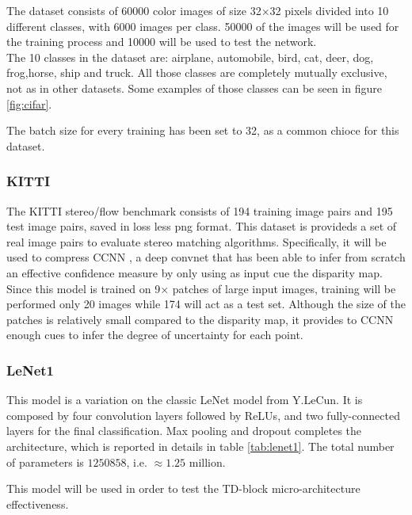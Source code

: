The dataset consists of 60000 color images of size 32×32 pixels divided into 10 different classes, with 6000 images per class. 50000 of the images will be used for the training process and 10000 will be used to test the network. \\
The 10 classes in the dataset are: airplane, automobile, bird, cat, deer, dog, frog,horse, ship and truck. All those classes are completely mutually exclusive, not as in other datasets. Some examples of those classes can be seen in figure \ref{fig:cifar}. 

The batch size for every training has been set to 32, as a common chioce for this dataset.

\subsubsection{KITTI}
The KITTI stereo/flow benchmark consists of 194 training image pairs and 195 test image pairs, saved in loss less png format. This dataset is provideds a set of real image pairs to evaluate stereo matching algorithms. Specifically, it will be used to compress CCNN \parencite{WCCNN}, a deep convnet that has been able to infer from scratch an effective confidence measure by only using as input cue the disparity map. 
\\

Since this model is trained on 9$\times $ patches of large input images, training will be performed only 20 images while 174 will act as a test set. Although the size of the patches is relatively small compared to the disparity map, it provides to CCNN enough cues to infer the degree of uncertainty for each point.

\subsubsection{LeNet1}
This model is a variation on the classic LeNet\parencite{lenet} model from Y.LeCun. It is composed by four convolution layers followed by ReLUs, and two fully-connected layers for the final classification. Max pooling and dropout completes the architecture, which is reported in details in table  \ref{tab:lenet1}. The total number of parameters is $1250858$, i.e. $\approx 1.25$ million. 
\newline 

This model will be used in order to test the TD-block micro-architecture effectiveness. 


